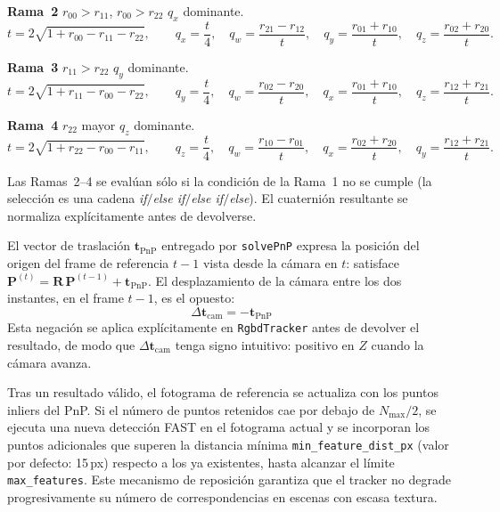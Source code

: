 \noindent\textbf{Rama~2} \quad $r_{00}>r_{11}$, $r_{00}>r_{22}$
\quad\textrightarrow\quad $q_x$ dominante.
\begin{equation}
  \label{eq:shepperd-b2}
  t = 2\sqrt{1+r_{00}-r_{11}-r_{22}}, \qquad
  q_x = \frac{t}{4}, \quad
  q_w = \frac{r_{21}-r_{12}}{t}, \quad
  q_y = \frac{r_{01}+r_{10}}{t}, \quad
  q_z = \frac{r_{02}+r_{20}}{t}.
\end{equation}

\noindent\textbf{Rama~3} \quad $r_{11}>r_{22}$
\quad\textrightarrow\quad $q_y$ dominante.
\begin{equation}
  \label{eq:shepperd-b3}
  t = 2\sqrt{1+r_{11}-r_{00}-r_{22}}, \qquad
  q_y = \frac{t}{4}, \quad
  q_w = \frac{r_{02}-r_{20}}{t}, \quad
  q_x = \frac{r_{01}+r_{10}}{t}, \quad
  q_z = \frac{r_{12}+r_{21}}{t}.
\end{equation}

\noindent\textbf{Rama~4} \quad $r_{22}$ mayor
\quad\textrightarrow\quad $q_z$ dominante.
\begin{equation}
  \label{eq:shepperd-b4}
  t = 2\sqrt{1+r_{22}-r_{00}-r_{11}}, \qquad
  q_z = \frac{t}{4}, \quad
  q_w = \frac{r_{10}-r_{01}}{t}, \quad
  q_x = \frac{r_{02}+r_{20}}{t}, \quad
  q_y = \frac{r_{12}+r_{21}}{t}.
\end{equation}
\medskip

Las Ramas~2--4 se evalúan sólo si la condición de la Rama~1 no se cumple
(la selección es una cadena \emph{if}$/$\emph{else if}$/$\emph{else if}$/$\emph{else}). El cuaternión resultante se normaliza
explícitamente antes de devolverse.

El vector de traslación $\mathbf{t}_{\text{PnP}}$ entregado por \texttt{solvePnP}
expresa la posición del origen del frame de referencia $t-1$ vista desde la
cámara en $t$: satisface $\mathbf{P}^{(t)} = \mathbf{R}\,\mathbf{P}^{(t-1)} + \mathbf{t}_{\text{PnP}}$.
El desplazamiento de la cámara entre los dos instantes, en el frame $t-1$, es el opuesto:
%
\begin{equation}
  \label{eq:pnp-sign}
  \Delta\mathbf{t}_{\text{cam}} = -\mathbf{t}_{\text{PnP}}
\end{equation}
%
Esta negación se aplica explícitamente en \texttt{RgbdTracker} antes de
devolver el resultado, de modo que $\Delta\mathbf{t}_{\text{cam}}$ tenga
signo intuitivo: positivo en $Z$ cuando la cámara avanza.

Tras un resultado válido, el fotograma de referencia se actualiza con los
puntos inliers del PnP. Si el número de puntos retenidos cae por debajo
de $N_{\max} / 2$, se ejecuta una nueva detección FAST en el fotograma
actual y se incorporan los puntos adicionales que superen la distancia mínima
\texttt{min\_feature\_dist\_px} (valor por defecto: 15\,px) respecto a los
ya existentes, hasta alcanzar el límite \texttt{max\_features}. Este
mecanismo de reposición garantiza que el tracker no degrade progresivamente
su número de correspondencias en escenas con escasa textura.

